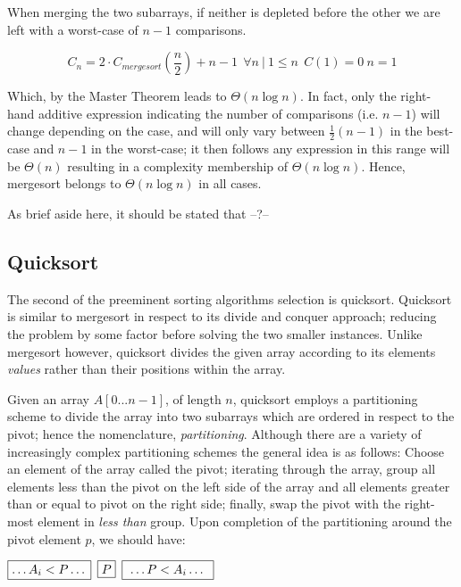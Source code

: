\documentclass[11pt,letterpaper]{report}
\begin{document}
When merging the two subarrays, if neither is depleted before the other we are left with a worst-case of $n-1$ comparisons. 

\begin{equation} 
C_n=2 \cdot C_{mergesort}(\frac{n}{2})+n-1 \ \ \forall n~ | \ 1 \leq n \ \ C(1) = 0 \ n=1
\end{equation}

Which, by the Master Theorem leads to $\Theta(n\log{}n)$. In fact, only the right-hand additive expression indicating the number of comparisons (i.e. $n-1$) will change depending on the case, and will only vary between $\frac{1}{2}(n-1)$ in the best-case and $n-1$ in the worst-case; it then follows any expression in this range will be $\Theta(n)$ resulting in a complexity membership of $\Theta(n\log{}n)$. Hence, mergesort belongs to $\Theta(n\log{}n)$ in all cases.

As brief aside here, it should be stated that --?--

\subsection*{Quicksort}			%
The second of the preeminent sorting algorithms selection is quicksort. Quicksort is similar to mergesort in respect to its divide and conquer approach; reducing the problem by some factor before solving the two smaller instances. Unlike mergesort however, quicksort divides the given array according to its elements \emph{values} rather than their positions within the array.

Given an array $A[0...n-1]$, of length $n$, quicksort employs a partitioning scheme to divide the array into two subarrays which are ordered in respect to the pivot; hence the nomenclature, \emph{partitioning}. Although there are a variety of increasingly complex partitioning schemes the general idea is as follows:
Choose an element of the array called the pivot; iterating through the array, group all elements less than the pivot on the left side of the array and all elements greater than or equal to pivot on the right side; finally, swap the pivot with the right-most element in \emph{less than} group. Upon completion of the partitioning around the pivot element $p$, we should have:

\begin{center}
  \newcommand{\sep}{\hspace*{.5em}}
  $ \fbox{$\dots A_i  < P \dots$} \sep \fbox{$P$} \sep \fbox{  $ \dots P < A_i \dots$    } $
\end{center}
\end{document}

